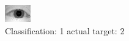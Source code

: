 \begin{figure}[h!]
\begin{center}
\includegraphics[width=0.60\columnwidth]{figures/ID940_class_1_target_2.png}
\end{center}
\caption{ Classification: 1 actual target: 2}
\label{fig:ID940_class_1_target_2}
\end{figure}
